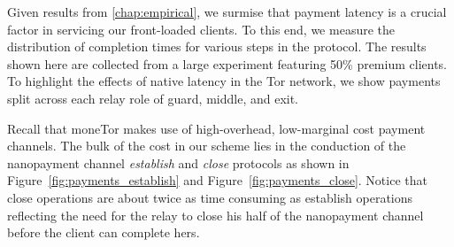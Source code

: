 Given results from \autoref{chap:empirical}, we surmise that payment
latency is a crucial factor in servicing our front-loaded clients. To this end,
we measure the distribution of completion times for various steps in the
protocol. The results shown here are collected from a large experiment featuring
50\% premium clients. To highlight the effects of native latency in the Tor
network, we show payments split across each relay role of guard, middle, and
exit.

Recall that moneTor makes use of high-overhead, low-marginal cost payment
channels. The bulk of the cost in our scheme lies in the conduction of the
nanopayment channel \emph{establish} and \emph{close} protocols as shown in
Figure~\ref{fig:payments_establish} and Figure~\ref{fig:payments_close}. Notice
that close operations are about twice as time consuming as establish operations
reflecting the need for the relay to close his half of the nanopayment channel
before the client can complete hers.

